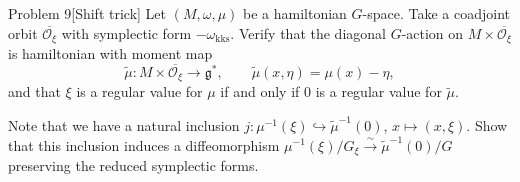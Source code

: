 \begin{thing3}{Problem 9}[Shift trick]\leavevmode
Let $(M,\omega,\mu)$ be a hamiltonian $G$-space. Take a coadjoint orbit $\overline{\mathcal{O}_\xi}$ with symplectic form $-\omega_{\operatorname{kks}}$. Verify that the diagonal $G$-action on $M\times\overline{\mathcal{O}_\xi}$ is hamiltonian with moment map
\[\tilde{\mu}:M\times\overline{\mathcal{O}_\xi}\longrightarrow\mathfrak{g}^* ,\qquad \tilde{\mu}(x,\eta)=\mu(x)-\eta,\]
and that $\xi$ is a regular value for $\mu$ if and only if $0$ is a regular value for  $\tilde{\mu}$.

Note that we have a natural inclusion $j:\mu^{-1}(\xi)\hookrightarrow \tilde{\mu}^{-1}(0)$, $x\mapsto (x,\xi)$. Show that this inclusion induces a diffeomorphism $\mu^{-1}(\xi)/G_\xi\overset{\sim}{\longrightarrow}\tilde{\mu}^{-1}(0)/G$ preserving the reduced symplectic forms.
\end{thing3}

